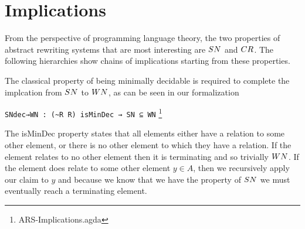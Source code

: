 \section{Implications}
\label{sec:Implications}

From the perspective of programming language theory, the two properties of abstract rewriting 
systems that are most interesting are $\SN$ and $\CR$. The following hierarchies 
show chains of implications starting from these properties.

\begin{center}

\end{center}
  
The classical property of being minimally decidable is required to complete the implcation 
from $\SN$ to $\WN$, as can be seen in our formalization

\verb|SNdec→WN : (~R R) isMinDec → SN ⊆ WN| \footnote{ARS-Implications.agda}


The isMinDec property states that all elements either have a relation to some other element, or 
there is no other element to which they have a relation. If the element relates to no other element then it is terminating 
and so trivially $\WN$. If the element does relate to some other element $y \in A$, then we recursively apply our claim to 
$y$ and because we know that we have the property of $\SN$ we must eventually reach a terminating element. 

